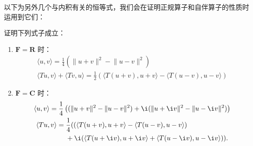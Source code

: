 以下为另外几个与内积有关的恒等式，我们会在证明正规算子和自伴算子的性质时运用到它们：

\begin{example}{}{}
    证明下列式子成立：
    \begin{enumerate}
        \item $\mathbf{F} = \mathbf{R}$ 时：
              \begin{gather}
                  \label{eq:23:内积和范数的性质1}
                  \langle u, v\rangle = \frac{1}{4}\left( \lVert u + v \rVert^2 - \lVert u - v \rVert^2\right) \\
                  \label{eq:23:内积和范数的性质2}
                  \langle Tu, v\rangle + \langle Tv, u\rangle = \frac{1}{2}\left(\langle T(u + v), u + v\rangle - \langle T(u - v), u - v\rangle\right)
              \end{gather}

        \item $\mathbf{F} = \mathbf{C}$ 时：
              \begin{gather}
                  \label{eq:23:内积和范数的性质3}
                  \langle u, v\rangle = \frac{1}{4}\left((\lVert u + v \rVert^2 - \lVert u - v \rVert^2) + \i(\lVert u + \i v \rVert^2 - \lVert u - \i v \rVert^2)\right) \\
                  \label{eq:23:内积和范数的性质4}
                  \begin{aligned}
                      \langle Tu, v\rangle ={} & \frac{1}{4}  ((\langle T(u + v), u + v\rangle - \langle T(u - v), u - v\rangle)     \\
                                               & + \i(\langle T(u + \i v), u + \i v\rangle + \langle T(u - \i v), u - \i v\rangle)).
                  \end{aligned}
              \end{gather}
    \end{enumerate}

\end{example}

